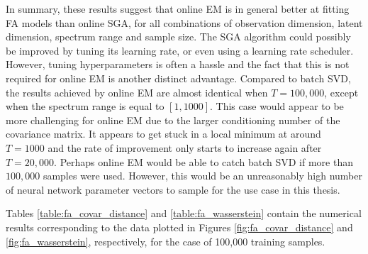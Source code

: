 \documentclass[msc,deptreport.inf]{infthesis} %
\begin{document}
In summary, these results suggest that online EM is in general better at fitting FA models than online SGA, for all combinations of observation dimension, latent dimension, spectrum range and sample size. The SGA algorithm could possibly be improved by tuning its learning rate, or even using a learning rate scheduler. However, tuning hyperparameters is often a hassle and the fact that this is not required for online EM is another distinct advantage. Compared to batch SVD, the results achieved by online EM are almost identical when $T=100,000$, except when the spectrum range is equal to $[1, 1000]$. This case would appear to be more challenging for online EM due to the larger conditioning number of the covariance matrix. It appears to get stuck in a local minimum at around $T=1000$ and the rate of improvement only starts to increase again after $T=20,000$. Perhaps online EM would be able to catch batch SVD if more than $100,000$ samples were used. However, this would be an unreasonably high number of neural network parameter vectors to sample for the use case in this thesis. 

Tables \ref{table:fa_covar_distance} and \ref{table:fa_wasserstein} contain the numerical results corresponding to the data plotted in  Figures \ref{fig:fa_covar_distance} and \ref{fig:fa_wasserstein}, respectively, for the case of 100,000 training samples.  
\end{document}
